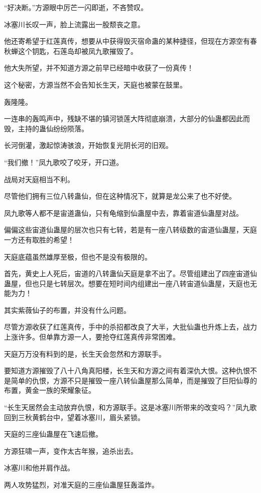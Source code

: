 \begin{this_body}
“好决断。”方源眼中厉芒一闪即逝，不吝赞叹。

冰塞川长叹一声，脸上流露出一股颓丧之意。

他还寄希望于红莲真传，想要从中获得毁灭宿命蛊的某种捷径，但现在方源空有春秋蝉这个钥匙，石莲岛却被凤九歌摧毁了。

他大失所望，并不知道方源之前早已经暗中收获了一份真传！

这个秘密，方源当然不会告知长生天，天庭也被蒙在鼓里。

轰隆隆。

一连串的轰鸣声中，残缺不堪的镇河锁莲大阵彻底崩溃，大部分的仙蛊都因此而毁，主持的蛊仙纷纷陨落。

长河倒灌，激起惊涛骇浪，开始恢复光阴长河的旧观。

“我们撤！”凤九歌咬了咬牙，开口道。

战局对天庭相当不利。

尽管他们拥有三位八转蛊仙，但在这种情况下，就算是龙公来了也不好使。

凤九歌等人都不是宙道蛊仙，只有龟缩到仙蛊屋中去，靠着宙道仙蛊屋对战。

偏偏这些宙道仙蛊屋的层次也只有七转，若是有一座八转级数的宙道仙蛊屋，天庭一方还有取胜的希望！

天庭底蕴虽然雄厚至极，但也不是没有极限的。

首先，黄史上人死后，宙道的八转蛊仙天庭是拿不出了。尽管组建出了四座宙道仙蛊屋，但也只是七转层次。想要在短时间内组建出一座八转宙道仙蛊屋，天庭也无能为力！

其实紫薇仙子的布置，并没有什么问题。

尽管方源收获了红莲真传，手中的杀招都改良了大半，大批仙蛊也升炼上去，战力上涨许多。但单靠方源一人，要抢夺红莲真传非常困难。

天庭万万没有料到的是，长生天会忽然和方源联手。

要知道方源摧毁了八十八角真阳楼，长生天和方源之间有着深仇大恨。这种仇恨不是简单的仇恨，方源不只是摧毁一座八转仙蛊屋那么简单，而是摧毁了巨阳仙尊的布置，黄金一族的荣耀象征。

“长生天居然会主动放弃仇恨，和方源联手。这是冰塞川所带来的改变吗？”凤九歌回到三秋黄鹤台中，望着冰塞川，眉头紧锁。

天庭的三座仙蛊屋在飞速后撤。

方源狂啸一声，变作太古年猴，追杀出去。

冰塞川和他并肩作战。

两人攻势猛烈，对准天庭的三座仙蛊屋狂轰滥炸。


\end{this_body}
